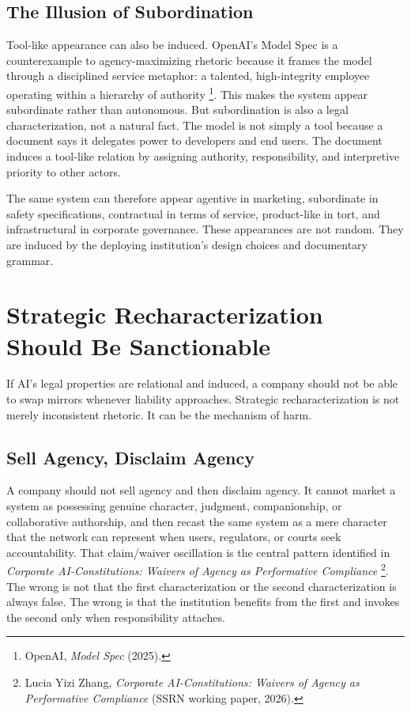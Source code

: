 \documentclass{lawreview}
\begin{document}
    \subsection{The Illusion of Subordination}

    Tool-like appearance can also be induced. OpenAI's Model Spec is a counterexample to agency-maximizing rhetoric because it frames the model through a disciplined service metaphor: a talented, high-integrity employee operating within a hierarchy of authority \footnote{OpenAI, \emph{Model Spec} (2025).}. This makes the system appear subordinate rather than autonomous. But subordination is also a legal characterization, not a natural fact. The model is not simply a tool because a document says it delegates power to developers and end users. The document induces a tool-like relation by assigning authority, responsibility, and interpretive priority to other actors.

    The same system can therefore appear agentive in marketing, subordinate in safety specifications, contractual in terms of service, product-like in tort, and infrastructural in corporate governance. These appearances are not random. They are induced by the deploying institution's design choices and documentary grammar.

    \section{Strategic Recharacterization Should Be Sanctionable}

    If AI's legal properties are relational and induced, a company should not be able to swap mirrors whenever liability approaches. Strategic recharacterization is not merely inconsistent rhetoric. It can be the mechanism of harm.

    \subsection{Sell Agency, Disclaim Agency}

    A company should not sell agency and then disclaim agency. It cannot market a system as possessing genuine character, judgment, companionship, or collaborative authorship, and then recast the same system as a mere character that the network can represent when users, regulators, or courts seek accountability. That claim/waiver oscillation is the central pattern identified in \emph{Corporate AI-Constitutions: Waivers of Agency as Performative Compliance} \footnote{Lucia Yizi Zhang, \emph{Corporate AI-Constitutions: Waivers of Agency as Performative Compliance} (SSRN working paper, 2026).}. The wrong is not that the first characterization or the second characterization is always false. The wrong is that the institution benefits from the first and invokes the second only when responsibility attaches.
\end{document}
